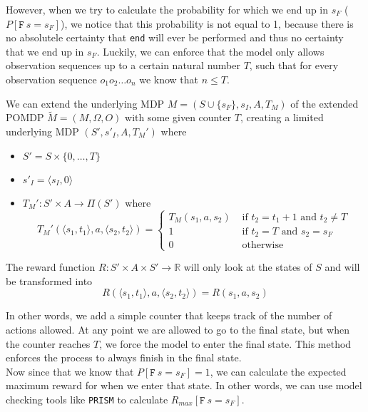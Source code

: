 \label{s:induced_limit}
However, when we try to calculate the probability for which we end up in $s_F$ ($P[ \texttt{F}\:s=s_F]$), we notice that this probability is not equal to 1, because there is no absolutele certainty that \texttt{end} will ever be performed and thus no certainty that we end up in $s_F$. Luckily, we can enforce that the model only allows observation sequences up to a certain natural number $T$, such that for every observation sequence $o_1 o_2 \dots o_n$ we know that $n\leq T$. 

\begin{definition}
We can extend the underlying MDP $M=(S\cup\{s_F\}, s_I, A, T_M)$ of the extended POMDP $\widetilde{M}=(M,\Omega,O)$ with some given counter $T$, creating a limited underlying MDP $(S',s'_I,A,T_M')$ where
\begin{itemize}
	\item $S' = S\times \{0,\dots, T\}$
	\item $s'_I = \langle s_I,0\rangle$
	\item $T_M':S'\times A \to \Pi(S')$ where 
	\[T_M'(\langle s_1,t_1\rangle,a,\langle s_2,t_2\rangle) = \begin{cases}
	T_M(s_1,a,s_2) & \text{ if } t_2 = t_1 + 1 \text{ and } t_2 \neq T\\
	1 & \text{ if } t_2 = T \text{ and } s_2 = s_F \\
	0 & \text{ otherwise }
	\end{cases}\]
\end{itemize}
\label{d:limited_pomdp}

The reward function $R:S'\times A\times S' \to \mathbb{R}$ will only look at the states of $S$ and will be transformed into
\[R(\langle s_1, t_1\rangle, a, \langle s_2, t_2\rangle) = R(s_1,a,s_2)\]
\end{definition}

In other words, we add a simple counter that keeps track of the number of actions allowed. At any point we are allowed to go to the final state, but when the counter reaches $T$, we force the model to enter the final state. This method enforces the process to always finish in the final state. \\

Now since that we know that $P[ \texttt{F}\:s=s_F]=1$, we can calculate the expected maximum reward for when we enter that state. In other words, we can use model checking tools like \texttt{PRISM} to calculate $R_{max}[\texttt{F}\:s=s_F]$.